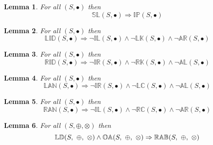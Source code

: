 \documentclass[10pt]{report}
\newcommand{\propname}[1]{{\mathbb{#1}}}
\newtheorem{lemma}{Lemma}
\begin{document}
\begin{lemma} \label{lem:sl_implies_ip}
For all $(S, \bullet)$ then
\begin{equation*}
\propname{SL}(S, \bullet) \Rightarrow \propname{IP}(S, \bullet)
\end{equation*}
\end{lemma}

\begin{lemma} \label{lem:lid_implies_n_il_lk_ar}
For all $(S, \bullet)$ then
\begin{equation*}
\propname{LID}(S, \bullet) \Rightarrow \neg \propname{IL}(S, \bullet) \wedge \neg \propname{LK}(S, \bullet) \wedge \neg \propname{AR}(S, \bullet)
\end{equation*}
\end{lemma}

\begin{lemma} \label{lem:rid_implies_n_ir_rk_al}
For all $(S, \bullet)$ then
\begin{equation*}
\propname{RID}(S, \bullet) \Rightarrow \neg \propname{IR}(S, \bullet) \wedge \neg \propname{RK}(S, \bullet) \wedge \neg \propname{AL}(S, \bullet)
\end{equation*}
\end{lemma}

\begin{lemma} \label{lem:lan_implies_n_ir_lc_al}
For all $(S, \bullet)$ then
\begin{equation*}
\propname{LAN}(S, \bullet) \Rightarrow \neg \propname{IR}(S, \bullet) \wedge \neg \propname{LC}(S, \bullet) \wedge \neg \propname{AL}(S, \bullet)
\end{equation*}
\end{lemma}

\begin{lemma} \label{lem:ran_implies_n_il_rc_ar}
For all $(S, \bullet)$ then
\begin{equation*}
\propname{RAN}(S, \bullet) \Rightarrow \neg \propname{IL}(S, \bullet) \wedge \neg \propname{RC}(S, \bullet) \wedge \neg \propname{AR}(S, \bullet)
\end{equation*}
\end{lemma}

\begin{lemma} \label{lem:ld_oa_implies_rab}
For all $(S, \oplus, \otimes)$ then
\begin{equation*}
\propname{LD}(S,\ \oplus,\ \otimes) \wedge \propname{OA}(S,\ \oplus,\ \otimes) \Rightarrow \propname{RAB}(S,\ \oplus, \ \otimes)\\
\end{equation*}
\end{lemma}
\end{document}
